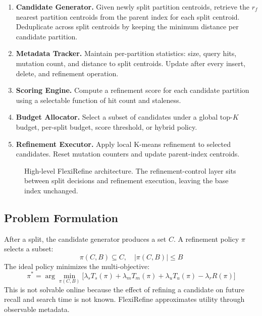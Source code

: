 \documentclass[sigconf, nonacm]{acmart}
\newcommand{\system}{FlexiRefine\xspace}
\begin{document}
\begin{enumerate}[leftmargin=*]
  \item \textbf{Candidate Generator.}
    Given newly split partition centroids, retrieve the $r_f$ nearest
    partition centroids from the parent index for each split centroid.
    Deduplicate across split centroids by keeping the minimum distance
    per candidate partition.

  \item \textbf{Metadata Tracker.}
    Maintain per-partition statistics: size, query hits, mutation count,
    and distance to split centroids. Update after every insert, delete,
    and refinement operation.

  \item \textbf{Scoring Engine.}
    Compute a refinement score for each candidate partition using a
    selectable function of hit count and staleness.

  \item \textbf{Budget Allocator.}
    Select a subset of candidates under a global top-$K$ budget,
    per-split budget, score threshold, or hybrid policy.

  \item \textbf{Refinement Executor.}
    Apply local K-means refinement to selected candidates.
    Reset mutation counters and update parent-index centroids.
\end{enumerate}

\begin{figure}[h]
  \centering
  \caption{High-level \system architecture. The refinement-control layer
    sits between split decisions and refinement execution, leaving the
    base index unchanged.}
  \label{fig:architecture}
\end{figure}

\subsection{Problem Formulation}

After a split, the candidate generator produces a set $C$. A
refinement policy $\pi$ selects a subset:
\begin{equation}
  \pi(C, B) \subseteq C, \quad |\pi(C,B)| \leq B
\end{equation}
The ideal policy minimizes the multi-objective:
\begin{equation}
  \pi^* = \arg\min_{\pi(C,B)}
    \bigl[\lambda_s T_s(\pi) + \lambda_m T_m(\pi) + \lambda_u T_u(\pi)
          - \lambda_r R(\pi)\bigr]
\end{equation}
This is not solvable online because the effect of refining a candidate
on future recall and search time is not known. \system approximates
utility through observable metadata.
\end{document}
